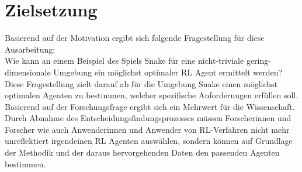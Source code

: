 \section{Zielsetzung} \label{sec:Einleitung_Forschungsfrage}
Basierend auf der Motivation ergibt sich folgende Fragestellung für diese Ausarbeitung:\\
Wie kann an einem Beispiel des Spiels Snake für eine nicht-triviale gering-dimensionale Umgebung ein möglichst optimaler RL Agent ermittelt werden?\\
Diese Fragestellung zielt darauf ab für die Umgebung Snake einen möglichst optimalen Agenten zu bestimmen, welcher spezifische Anforderungen erfüllen soll.\\
Basierend auf der Forschungsfrage ergibt sich ein Mehrwert für die Wissenschaft. Durch Abnahme des Entscheidungsfindungsprozesses müssen Forscherinnen und Forscher wie auch Anwenderinnen und Anwender von RL-Verfahren nicht mehr unreflektiert irgendeinen RL Agenten auswählen, sondern können auf Grundlage der Methodik und der daraus hervorgehenden Daten den passenden Agenten bestimmen.

